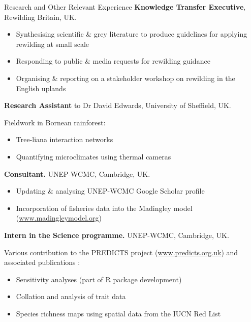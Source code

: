 \renewcommand\labelitemi{$\diamond$}

\begin{rubric}{Research and Other Relevant Experience}
\entry*[2016]%
	\textbf{Knowledge Transfer Executive}, Rewilding Britain, UK.
	\begin{itemize}[topsep=0pt,itemsep=-1ex,partopsep=1ex,parsep=1ex]
	\item Synthesising scientific \& grey literature to produce guidelines for applying rewilding at small scale
	\item Responding to public \& media requests for rewilding guidance
	\item Organising \& reporting on a stakeholder workshop on rewilding in the English uplands \parencite{sandom_rewilding_2018}
	\end{itemize}
\entry*[2014]%
	\textbf{Research Assistant} to Dr David Edwards, University of Sheffield, UK.
	\par Fieldwork in Bornean rainforest:
	\begin{itemize}[topsep=0pt,itemsep=-1ex,partopsep=1ex,parsep=1ex]
	\item Tree-liana interaction networks \parencite{magrach_selective_2016}
	\item Quantifying microclimates using thermal cameras \parencite{scheffers_extreme_2017}
	\end{itemize}
\entry*[2013 -- 2014]%
	\textbf{Consultant.} UNEP-WCMC, Cambridge, UK.
	\begin{itemize}[topsep=0pt,itemsep=-1ex,partopsep=1ex,parsep=1ex]
	\item Updating \& analysing UNEP-WCMC Google Scholar profile
	\item Incorporation of fisheries data into the Madingley model (\url{www.madingleymodel.org})
	\end{itemize}
\entry*[2013]%
	\textbf{Intern in the Science programme.} UNEP-WCMC, Cambridge, UK.
	\par Various contribution to the PREDICTS project (\url{www.predicts.org.uk}) and associated publications \parencite{newbold_global_2015, hudson_predicts_2014, hudson_database_2017}: 
	\begin{itemize}[topsep=0pt,itemsep=-1ex,partopsep=1ex,parsep=1ex]
	\item Sensitivity analyses (part of R package development)
	\item Collation and analysis of trait data
	\item Species richness maps using spatial data from the IUCN Red List
	\end{itemize}
%
\end{rubric}
